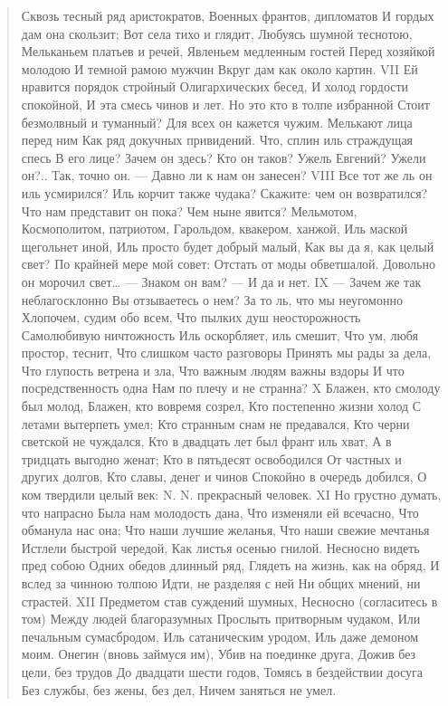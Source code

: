 \begin{verse}
Сквозь тесный ряд аристократов,
Военных франтов, дипломатов
И гордых дам она скользит;
Вот села тихо и глядит,
Любуясь шумной теснотою,
Мельканьем платьев и речей,
Явленьем медленным гостей
Перед хозяйкой молодою
И темной рамою мужчин
Вкруг дам как около картин.
VII
Ей нравится порядок стройный
Олигархических бесед,
И холод гордости спокойной,
И эта смесь чинов и лет.
Но это кто в толпе избранной
Стоит безмолвный и туманный?
Для всех он кажется чужим.
Мелькают лица перед ним
Как ряд докучных привидений.
Что, сплин иль страждущая спесь
В его лице? Зачем он здесь?
Кто он таков? Ужель Евгений?
Ужели он?.. Так, точно он.
— Давно ли к нам он занесен?
VIII
Все тот же ль он иль усмирился?
Иль корчит также чудака?
Скажите: чем он возвратился?
Что нам представит он пока?
Чем ныне явится? Мельмотом,
Космополитом, патриотом,
Гарольдом, квакером, ханжой,
Иль маской щегольнет иной,
Иль просто будет добрый малый,
Как вы да я, как целый свет?
По крайней мере мой совет:
Отстать от моды обветшалой.
Довольно он морочил свет…
— Знаком он вам? — И да и нет.
IX
— Зачем же так неблагосклонно
Вы отзываетесь о нем?
За то ль, что мы неугомонно
Хлопочем, судим обо всем,
Что пылких душ неосторожность
Самолюбивую ничтожность
Иль оскорбляет, иль смешит,
Что ум, любя простор, теснит,
Что слишком часто разговоры
Принять мы рады за дела,
Что глупость ветрена и зла,
Что важным людям важны вздоры
И что посредственность одна
Нам по плечу и не странна?
X
Блажен, кто смолоду был молод,
Блажен, кто вовремя созрел,
Кто постепенно жизни холод
С летами вытерпеть умел;
Кто странным снам не предавался,
Кто черни светской не чуждался,
Кто в двадцать лет был франт иль хват,
А в тридцать выгодно женат;
Кто в пятьдесят освободился
От частных и других долгов,
Кто славы, денег и чинов
Спокойно в очередь добился,
О ком твердили целый век:
N. N. прекрасный человек.
XI
Но грустно думать, что напрасно
Была нам молодость дана,
Что изменяли ей всечасно,
Что обманула нас она;
Что наши лучшие желанья,
Что наши свежие мечтанья
Истлели быстрой чередой,
Как листья осенью гнилой.
Несносно видеть пред собою
Одних обедов длинный ряд,
Глядеть на жизнь, как на обряд,
И вслед за чинною толпою
Идти, не разделяя с ней
Ни общих мнений, ни страстей.
XII
Предметом став суждений шумных,
Несносно (согласитесь в том)
Между людей благоразумных
Прослыть притворным чудаком,
Или печальным сумасбродом,
Иль сатаническим уродом,
Иль даже демоном моим.
Онегин (вновь займуся им),
Убив на поединке друга,
Дожив без цели, без трудов
До двадцати шести годов,
Томясь в бездействии досуга
Без службы, без жены, без дел,
Ничем заняться не умел.

\end{verse}
